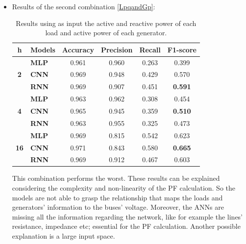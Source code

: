 \begin{itemize}
    \item Results of the second combination     \ref{LpqandGp}:
    
    \begin{table}[h]
    \centering
    \begin{tabular}{|c|l|c|c|c|c|}
    \hline
    \textbf{h} &
      \textbf{Models} &
      \multicolumn{1}{l|}{\textbf{Accuracy}} &
      \multicolumn{1}{l|}{\textbf{Precision}} &
      \multicolumn{1}{l|}{\textbf{Recall}} &
      \multicolumn{1}{l|}{\textbf{F1-score}} \\ \hline
    \multirow{3}{*}{\textbf{2}}  & \textbf{MLP} & 0.961 & 0.960 & 0.263 & 0.399 \\ \cline{2-6} 
                                 & \textbf{CNN} & 0.969 & 0.948 & 0.429 & 0.570 \\ \cline{2-6} 
                                 & \textbf{RNN} & 0.969 & 0.907 & 0.451 & \textbf{0.591} \\ \hline
    \multirow{3}{*}{\textbf{4}}  & \textbf{MLP} & 0.963 & 0.962 & 0.308 & 0.454 \\ \cline{2-6} 
                                 & \textbf{CNN} & 0.965 & 0.945 & 0.359 & \textbf{0.510} \\ \cline{2-6} 
                                 & \textbf{RNN} & 0.963 & 0.955 & 0.325 & 0.473 \\ \hline
    \multirow{3}{*}{\textbf{16}} & \textbf{MLP} & 0.969 & 0.815 & 0.542 & 0.623 \\ \cline{2-6} 
                                 & \textbf{CNN} & 0.971 & 0.843 & 0.580 & \textbf{0.665} \\ \cline{2-6} 
                                 & \textbf{RNN} & 0.969 & 0.912 & 0.467 & 0.603 \\ \hline
    \end{tabular}
    \caption[Models' results using loads and generators information]{Results using as input the active and reactive power of each load and active power of each generator.}
    \end{table}
    This combination performs the worst. These results can be explained considering the complexity and non-linearity of the \gls{PF} calculation. So the models are not able to grasp the relationship that maps the loads and generators' information to the buses' voltage. Moreover, the \glspl{ANN} are missing all the information regarding the network, like for example the lines' resistance, impedance etc; essential for the \gls{PF} calculation. Another possible explanation is a large input space.
    

\end{itemize}
